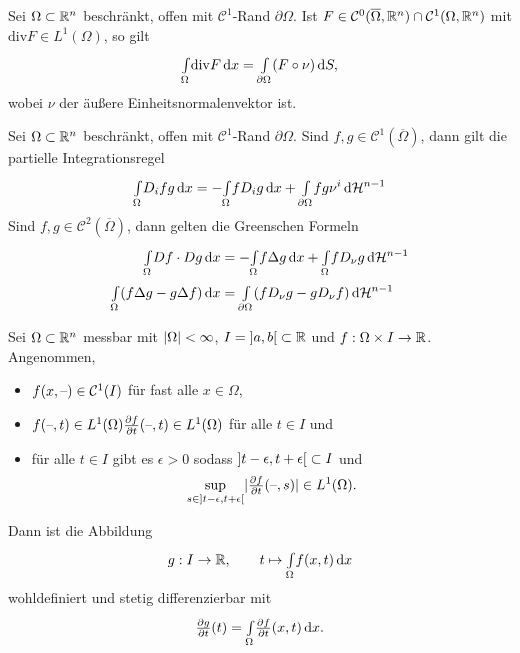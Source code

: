 \documentclass{cheat-sheet}
\newcommand{\dive}{\mathrm{div}} %
\newcommand{\HM}{\mathcal{H}} %
\begin{document}
\begin{satz}[Gauß]
  Sei $\Omega \subset \mathbb{R}^n$ beschränkt, offen mit $\mathcal{C}^1$-Rand $\partial \Omega$. Ist $F \in \mathcal{C}^0(\overline{\Omega}, \mathbb{R}^n) \cap \mathcal{C}^1(\Omega, \mathbb{R}^n)$ mit $\dive F \in L^1(\Omega)$, so gilt
  \[ \Int{\Omega}{}{\dive F}{x} = \Int{\partial \Omega}{}{(F \circ \nu)}{S}, \]
  wobei $\nu$ der äußere Einheitsnormalenvektor ist.
\end{satz}

\begin{kor}
  Sei $\Omega \subset \mathbb{R}^n$ beschränkt, offen mit $\mathcal{C}^1$-Rand $\partial \Omega$. Sind $f, g \in \mathcal{C}^1(\overline{\Omega})$, dann gilt die partielle Integrationsregel
  \[ \Int{\Omega}{}{D_i f g}{x} = - \Int{\Omega}{}{f D_i g}{x} + \Int{\partial \Omega}{}{f g \nu^i}{\HM^{n-1}} \]
  Sind $f, g \in \mathcal{C}^2(\overline{\Omega})$, dann gelten die Greenschen Formeln
  \begin{align*}
    \Int{\Omega}{}{Df \cdot Dg}{x} &= - \Int{\Omega}{}{f \Delta g}{x} + \Int{\Omega}{}{f D_{\nu} g}{\HM^{n-1}}\\
    \Int{\Omega}{}{(f \Delta g - g \Delta f)}{x} &= \Int{\partial \Omega}{}{(f D_{\nu} g - g D_{\nu} f)}{\HM^{n-1}}
  \end{align*}
\end{kor}

\begin{prop}
  Sei $\Omega \subset \mathbb{R}^n$ messbar mit $\lvert\Omega\rvert < \infty$, $I = \left] a, b \right[ \subset \mathbb{R}$ und $f : \Omega \times I \to \mathbb{R}$. Angenommen,
  \begin{itemize}
    \item $f(x, \text{--}) \in \mathcal{C}^1(I)$ für fast alle $x \in \Omega$,
    \item $f(\text{--}, t) \in L^1(\Omega) \tfrac{\partial f}{\partial t}(\text{--}, t) \in L^1(\Omega)$ für alle $t \in I$ und
    \item für alle $t \in I$ gibt es $\epsilon > 0$ sodass $\left] t-\epsilon, t+\epsilon \right[ \subset I$ und
    \[ \sup_{s \in \left] t-\epsilon, t+\epsilon \right[} \lvert\tfrac{\partial f}{\partial t}(\text{--}, s)\rvert \in L^1(\Omega). \]
  \end{itemize}
  Dann ist die Abbildung
  \[
    g : I \to \mathbb{R}, \qquad
    t \mapsto {\textstyle \int\limits_{\Omega}^{}} f(x, t) \,\mathrm{d} x
  \]
  wohldefiniert und stetig differenzierbar mit
  \[ \tfrac{\partial g}{\partial t}(t) = {\textstyle \int\limits_{\Omega}^{}} \tfrac{\partial f}{\partial t}(x,t) \,\mathrm{d} x. \]
\end{prop}
\end{document}
